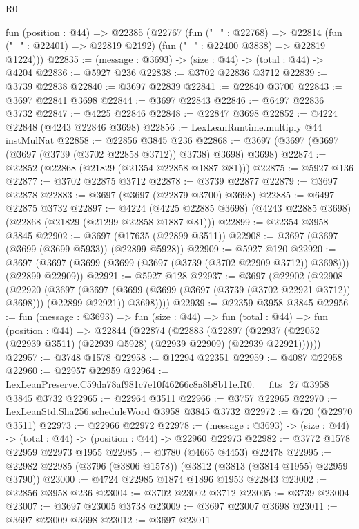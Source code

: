 \begin{lexlean}{R0}
\begin{coremodule}
  fun (position : @44) =>
  @22385
    (@22767
      (fun ("_" : @22768) =>
      @22814 (fun ("_" : @22401) => @22819 @2192) (fun ("_" : @22400 @3838) => @22819 @1224)))
@22835 := (message : @3693) -> (size : @44) -> (total : @44) -> @4204
@22836 := @5927 @236
@22838 := @3702 @22836 @3712
@22839 := @3739 @22838
@22840 := @3697 @22839
@22841 := @22840 @3700
@22843 := @3697 @22841 @3698
@22844 := @3697 @22843
@22846 := @6497 @22836 @3732
@22847 := @4225 @22846
@22848 := @22847 @3698
@22852 := @4224 @22848 (@4243 @22846 @3698)
@22856 := LexLeanRuntime.multiply @44 instMulNat
@22858 := @22856 @3845 @236
@22868 := @3697 (@3697 (@3697 (@3697 (@3739 (@3702 @22858 @3712)) @3738) @3698) @3698)
@22874 := @22852 (@22868 (@21829 (@21354 @22858 @1887 @81)))
@22875 := @5927 @136
@22877 := @3702 @22875 @3712
@22878 := @3739 @22877
@22879 := @3697 @22878
@22883 := @3697 (@3697 (@22879 @3700) @3698)
@22885 := @6497 @22875 @3732
@22897 := @4224
    (@4225 @22885 @3698)
    (@4243 @22885 @3698)
    (@22868 (@21829 (@21299 @22858 @1887 @81)))
@22899 := @22354 @3958 @3845
@22902 := @3697 (@17635 (@22899 @3511))
@22908 := @3697 (@3697 (@3699 (@3699 @5933)) (@22899 @5928))
@22909 := @5927 @120
@22920 := @3697 (@3697 (@3699 (@3699 (@3697 (@3739 (@3702 @22909 @3712)) @3698))) (@22899 @22909))
@22921 := @5927 @128
@22937 := @3697
    (@22902
      (@22908
        (@22920
          (@3697
            (@3697 (@3699 (@3699 (@3697 (@3739 (@3702 @22921 @3712)) @3698))) (@22899 @22921))
            @3698))))
@22939 := @22359 @3958 @3845
@22956 := fun (message : @3693) =>
  fun (size : @44) =>
  fun (total : @44) =>
  fun (position : @44) =>
  @22844
    (@22874
      (@22883
        (@22897 (@22937 (@22052 (@22939 @3511) (@22939 @5928) (@22939 @22909) (@22939 @22921))))))
@22957 := @3748 @1578
@22958 := @12294 @22351
@22959 := @4087 @22958
@22960 := @22957 @22959
@22964 := LexLeanPreserve.C59da78af981c7e10f46266c8a8b8b11e.R0.__fits_27 @3958 @3845 @3732
@22965 := @22964 @3511
@22966 := @3757 @22965
@22970 := LexLeanStd.Sha256.scheduleWord @3958 @3845 @3732
@22972 := @720 (@22970 @3511)
@22973 := @22966 @22972
@22978 := (message : @3693) -> (size : @44) -> (total : @44) -> (position : @44) -> @22960 @22973
@22982 := @3772 @1578 @22959 @22973 @1955
@22985 := @3780 (@4665 @4453) @22478
@22995 := @22982 @22985 (@3796 (@3806 @1578)) (@3812 (@3813 (@3814 @1955) @22959 @3790))
@23000 := @4724 @22985 @1874 @1896 @1953 @22843
@23002 := @22856 @3958 @236
@23004 := @3702 @23002 @3712
@23005 := @3739 @23004
@23007 := @3697 @23005 @3738
@23009 := @3697 @23007 @3698
@23011 := @3697 @23009 @3698
@23012 := @3697 @23011

\end{coremodule}
\end{lexlean}
